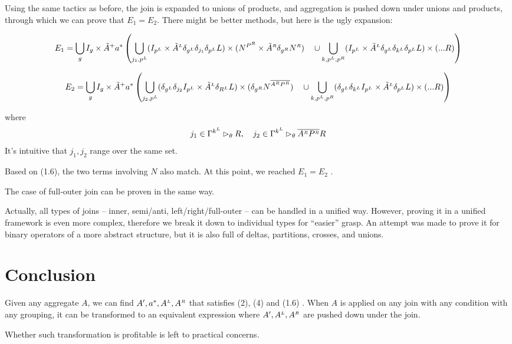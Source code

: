 \documentclass[article]{article}
\newcommand{\U}{\bigcup}
\newcommand{\ag}[1]{\overline{#1}}
\newcommand{\LL}{^\mathsmaller{\mathsmaller L}}
\newcommand{\RR}{^\mathsmaller{\mathsmaller R}}
\newcommand{\EA}{\tilde{A}}
\begin{document}
Using the same tactics as before, the join is expanded to unions of products,
and aggregation is pushed down under unions and products,
through which we can prove that $E_1 = E_2$.
There might be better methods, but here is the ugly expansion:

\begin{align*}
  E_1 = \U_g I_g \times \EA^+ a^*  \left(
  \U_{j_1, p\LL} (I_{p\LL}\times\EA\LL\delta_{g\LL}\delta_{j_1}\delta_{p\LL}L)
  \times(N^{P\RR}\times\EA\RR \delta_{g\RR}N\RR)  
  \quad\cup \U_{k,p\LL,p\RR} (
  I_{p\LL} \times \EA \LL \delta_{g\LL} \delta_{k\LL} \delta_{p\LL} L) \times (...R)\right) 
\end{align*}

\begin{align*}
  E_2 = \U_g I_g \times \EA^+ a^*  \left(
  \U_{j_2, p\LL} (\delta_{g\LL}\delta_{j_2}I_{p\LL}\times\EA\LL\delta_{R\LL}L)
  \times(\delta_{g\RR}N^{\ag{A\RR P\RR}})  
  \quad\cup \U_{k,p\LL,p\RR} (\delta_{g\LL} \delta_{k\LL} 
  I_{p\LL} \times \EA \LL \delta_{p\LL} L) \times (...R)\right)
\end{align*}

where 
$$ 
j_1 \in \Gamma^{k\LL} \rhd_\theta R ,  \quad
j_2 \in \Gamma^{k\LL} \rhd_\theta \ag{A\RR P\RR} R
$$
It's intuitive that $j_1 , j_2$ range over the same set.

Based on (1.6), the two terms involving $N$ also match.
At this point, we reached $E_1 = E_2$ .



The case of full-outer join can be proven in the same way.

Actually,  all types of joins -- inner, semi/anti, left/right/full-outer --
can be handled in a unified way. 
However, proving it in a unified framework 
is even more complex, therefore we break it down to individual types
for ``easier'' grasp.
An attempt was made to prove it for binary operators of a more abstract structure,
but it is also full of deltas, partitions, crosses, and unions.

\section{ Conclusion }

Given any aggregate $A$, we can find $A', a^*, A\LL, A\RR$ 
that satisfies (2), (4) and (1.6) . 
When $A$ is applied on any join with any condition with any grouping,
it can be transformed to an equivalent expression
where $A', A\LL, A\RR$ are pushed down under the join.


Whether such transformation is profitable is left to practical concerns.


\begin{appendices}



\end{appendices}
\end{document}
